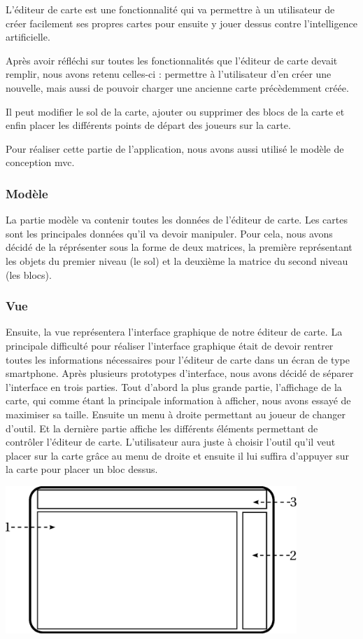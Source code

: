 	L'éditeur de carte est une fonctionnalité qui va permettre à un utilisateur
	 de créer facilement ses propres cartes pour ensuite y jouer dessus contre 
	 l'intelligence artificielle.
	 
	Après avoir réfléchi sur toutes les fonctionnalités que l'éditeur de carte 
	devait remplir, nous avons retenu celles-ci : permettre à l'utilisateur 
	d'en créer une nouvelle, mais aussi de pouvoir charger une ancienne carte 
	précèdemment créée.
	
	Il peut modifier le sol de la carte, ajouter ou supprimer des blocs de 
	la carte et enfin placer les différents points de départ des joueurs sur 
	la carte.
		
	Pour réaliser cette partie de l'application, nous avons aussi utilisé le 
	modèle de conception \gls{mvc}.

	\subsubsection*{Modèle}
		La partie modèle va contenir toutes les données de l'éditeur de carte. Les cartes sont les principales données qu'il va devoir manipuler. Pour cela, nous avons décidé de la réprésenter sous la forme de deux matrices, la première représentant les objets du premier niveau (le sol) et la deuxième la matrice du second niveau (les blocs).
			
			
	\subsubsection*{Vue}
		Ensuite, la vue représentera l'interface graphique de notre éditeur de carte. La principale difficulté pour réaliser l'interface graphique était de devoir rentrer toutes les informations nécessaires pour l'éditeur de carte dans un écran de type \gls{smartphone}. Après plusieurs prototypes d'interface, nous avons décidé de séparer l'interface en trois parties. Tout d'abord la plus grande partie, l'affichage de la carte, qui comme étant la principale information à afficher, nous avons essayé de maximiser sa taille. Ensuite un menu à droite permettant au joueur de changer d'outil. Et la dernière partie affiche les différents éléments permettant de contrôler l'éditeur de carte. L'utilisateur aura juste à choisir l'outil qu'il veut placer sur la carte grâce au menu de droite et ensuite il lui suffira d'appuyer sur la carte pour placer un bloc dessus.
		
		\begin{center}
			\includegraphics[width=11cm]{./Analyse/Img/14-Editeur_de_niveau.eps}
		\end{center} 
			
